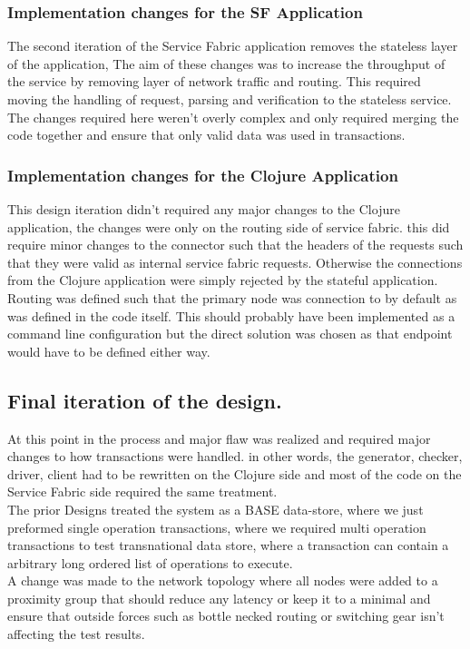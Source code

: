\documentclass[a4paper,10pt,titlepage]{report}
\begin{document}
    \subsubsection{Implementation changes for the SF Application}
    The second iteration of the Service Fabric application removes the stateless layer of the application, The aim of these changes was to increase the throughput of the service by removing  layer of network traffic and routing. This required moving the handling of request, parsing and verification to the stateless service.   \\
    
    The changes required here weren't overly complex and only required merging the code together and ensure that only valid data was used in transactions. 
    \\

    \subsubsection{Implementation changes for the Clojure Application}
        This design iteration didn't required any major changes to the Clojure application, the changes were only on the routing side of service fabric. this did require minor changes to the connector such that the headers of the requests such that they were valid as internal service fabric requests. Otherwise  the connections from the Clojure application were simply rejected by the stateful application. Routing was defined such that the primary node was connection to by default as was defined in the code itself. This should probably have been implemented as a command line configuration but the direct solution was chosen as that endpoint would have to be defined either way. 
    

\subsection{Final iteration of the design.}
    At this point in the process and major flaw was realized and required major changes to how transactions were handled. in other words, the generator, checker, driver, client had to be rewritten on the Clojure side and most of the code on the Service Fabric side required the same treatment. 
    \\
    The prior Designs treated the system as a BASE data-store, where we just preformed single operation transactions, where we required multi operation transactions to test transnational data store, where a transaction can contain a  arbitrary long ordered list of operations to execute. 
    \\
    A change was made to the network topology where all nodes were added to a proximity group that should reduce any latency or keep it to a minimal and ensure that outside forces such as bottle necked routing or switching gear isn't affecting the test results.  \\
    
\end{document}
